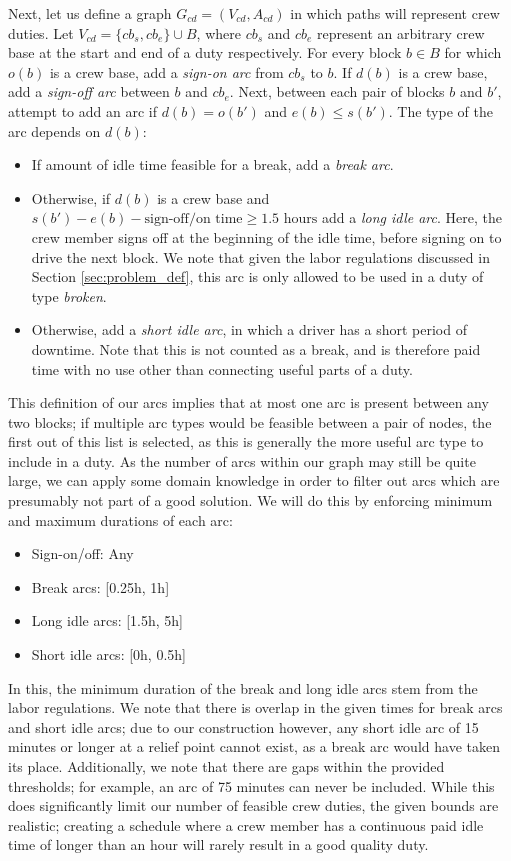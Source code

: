 \documentclass[]{article}
\begin{document}
Next, let us define a graph $G_{cd} = (V_{cd}, A_{cd})$ in which paths will represent crew duties. Let $V_{cd} = \{ cb_s, cb_e \} \cup B$, where $cb_s$ and $cb_e$ represent an arbitrary crew base at the start and end of a duty respectively. For every block $b \in B$ for which $o(b)$ is a crew base, add a \textit{sign-on arc} from $cb_s$ to $b$. If $d(b)$ is a crew base, add a \textit{sign-off arc} between $b$ and $cb_e$. Next, between each pair of blocks $b$ and $b'$, attempt to add an arc if $d(b) = o(b')$ and $e(b) \leq s(b')$. The type of the arc depends on $d(b)$:
\begin{itemize}
  \item If amount of idle time feasible for a break, add a \textit{break arc}.
  \item Otherwise, if $d(b)$ is a crew base and $s(b') - e(b) - \text{sign-off/on time} \geq 1.5\text{ hours}$ add a \textit{long idle arc}. Here, the crew member signs off at the beginning of the idle time, before signing on to drive the next block. We note that given the labor regulations discussed in Section \ref{sec:problem_def}, this arc is only allowed to be used in a duty of type \textit{broken}.
  \item Otherwise, add a \textit{short idle arc}, in which a driver has a short period of downtime. Note that this is not counted as a break, and is therefore paid time with no use other than connecting useful parts of a duty. 
\end{itemize}
This definition of our arcs implies that at most one arc is present between any two blocks; if multiple arc types would be feasible between a pair of nodes, the first out of this list is selected, as this is generally the more useful arc type to include in a duty. As the number of arcs within our graph may still be quite large, we can apply some domain knowledge in order to filter out arcs which are presumably not part of a good solution. We will do this by enforcing minimum and maximum durations of each arc:
\begin{itemize}
  \item Sign-on/off: Any
  \item Break arcs: [0.25h, 1h]
  \item Long idle arcs: [1.5h, 5h]
  \item Short idle arcs: [0h, 0.5h]
\end{itemize} 
In this, the minimum duration of the break and long idle arcs stem from the labor regulations. We note that there is overlap in the given times for break arcs and short idle arcs; due to our construction however, any short idle arc of 15 minutes or longer at a relief point cannot exist, as a break arc would have taken its place. Additionally, we note that there are gaps within the provided thresholds; for example, an arc of 75 minutes can never be included. While this does significantly limit our number of feasible crew duties, the given bounds are realistic; creating a schedule where a crew member has a continuous paid idle time of longer than an hour will rarely result in a good quality duty.
\end{document}
